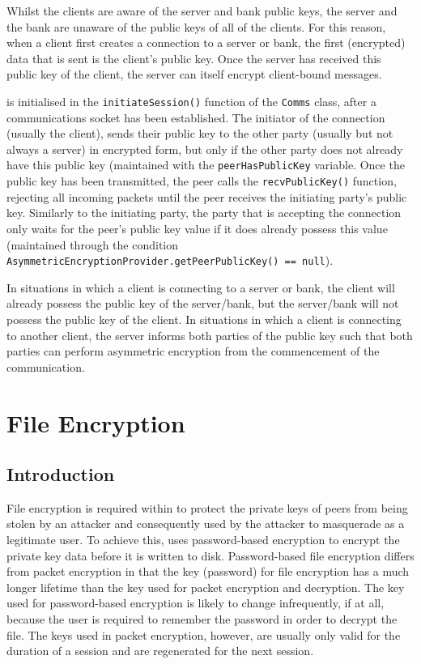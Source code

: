 \documentclass[a4paper,11pt]{article}
\begin{document}
Whilst the clients are aware of the server and bank public keys, the server and
the bank are unaware of the public keys of all of the clients. For this reason,
when a client first creates a connection to a \serviceName{} server or bank, the
first (encrypted) data that is sent is the client's public key. Once the server
has received this public key of the client, the server can itself encrypt
client-bound messages.

 is initialised in the \verb+initiateSession()+
function of the \verb+Comms+ class, after a communications socket has been
established. The initiator of the connection (usually the client), sends their
public key to the other party (usually but not always a server) in encrypted
form, but only if the other party does not already have this public key
(maintained with the \verb+peerHasPublicKey+ variable. Once the public key has
been transmitted, the \serviceName{} peer calls the \verb+recvPublicKey()+
function, rejecting all incoming packets until the peer receives the initiating
party's public key. Similarly to the initiating party, the party that is
accepting the connection only waits for the peer's public key value if it does
already possess this value (maintained through the condition \\
\verb+AsymmetricEncryptionProvider.getPeerPublicKey() == null+).

In situations in which a client is connecting to a \serviceName{} server or
bank, the client will already possess the public key of the server/bank, but the
server/bank will not possess the public key of the client. In situations in
which a client is connecting to another client, the server informs both parties
of the public key such that both parties can perform asymmetric encryption from
the commencement of the communication.

\section{File Encryption}

\subsection{Introduction}
File encryption is required within \packageName{} to protect the private keys of
\serviceName{} peers from being stolen by an attacker and consequently used by
the attacker to masquerade as a legitimate user. To achieve this, \packageName{}
uses password-based encryption to encrypt the private key data before it is
written to disk. Password-based file encryption differs from \packageName{}
packet encryption in that the key (password) for file encryption has a much
longer lifetime than the key used for packet encryption and decryption. The key
used for password-based encryption is likely to change infrequently, if at all,
because the user is required to remember the password in order to decrypt the
file. The keys used in packet encryption, however, are usually only valid for
the duration of a session and are regenerated for the next session.
\end{document}
